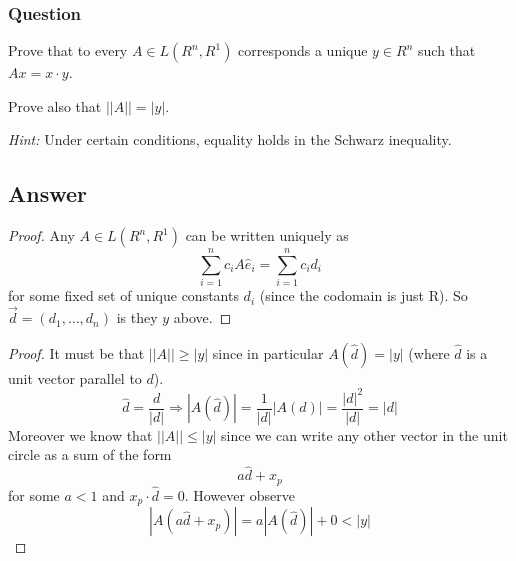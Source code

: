 \documentclass[12pt]{article}
\begin{document}
\subsubsection{Question}
Prove that to every $A \in L(R^n,R^1)$ corresponds a unique $y \in R^n$ such that $Ax =x \cdot y$.

Prove also that $||A||=|y|$.

\emph{Hint: }Under certain conditions, equality holds in the Schwarz inequality.
\subsection{Answer}
\begin{proof}
Any $A \in L(R^n,R^1)$ can be written uniquely  as 
\[ \sum_{i=1}^n c_i  A \hat{e}_i = \sum_{i=1}^n c_i d_i  \]
for some fixed set of unique  constants $d_i$ (since the codomain is just R). So $\vec{d}=(d_1,\dots,d_n)$ is they $y$ above. 
\end{proof}

\begin{proof}
It must be that  $||A||\geq|y|$ since in particular $A(\hat{d})=|y|$ (where $\hat{d}$ is a unit vector parallel to $d$). 
\[\hat{d}=\frac{d}{|d|} \Rightarrow |A(\hat{d})|= \frac{1}{|d|} |A(d)|=\frac{|d|^2}{|d|}= |d|\]
Moreover we know that $||A|| \leq |y|$ since we can write any other vector in the unit circle as a sum of the form
\[a\hat{d}+x_p\]
for some $a<1$ and $x_p\cdot \hat{d}=0$. However observe
\[|A(a\hat{d}+x_p)|=a|A(\hat{d})|+0< |y|\]
\end{proof}
\end{document}
